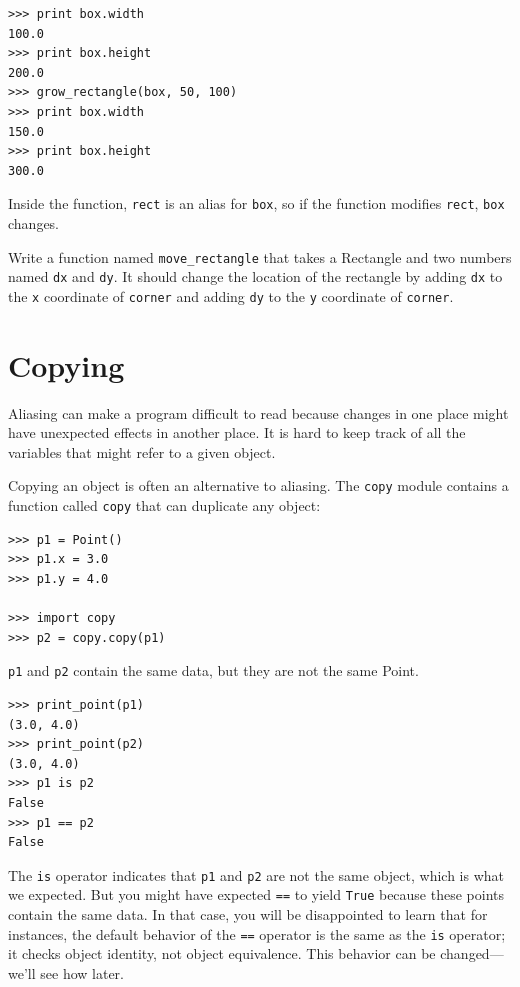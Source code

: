 \documentclass[10pt]{book}
\begin{document}
\begin{CJK}{UTF8}{gbsn}
\begin{verbatim}
>>> print box.width
100.0
>>> print box.height
200.0
>>> grow_rectangle(box, 50, 100)
>>> print box.width
150.0
>>> print box.height
300.0
\end{verbatim}
%
Inside the function, {\tt rect} is an
alias for {\tt box}, so if the function modifies {\tt rect}, 
{\tt box} changes.

\begin{exercise}

Write a function named \verb"move_rectangle" that takes
a Rectangle and two numbers named {\tt dx} and {\tt dy}.  It
should change the location of the rectangle by adding {\tt dx}
to the {\tt x} coordinate of {\tt corner} and adding {\tt dy}
to the {\tt y} coordinate of {\tt corner}.

\end{exercise}


\section{Copying}
\label{copying}

Aliasing can make a program difficult to read because changes
in one place might have unexpected effects in another place.
It is hard to keep track of all the variables that might refer
to a given object.

Copying an object is often an alternative to aliasing.
The {\tt copy} module contains a function called {\tt copy} that
can duplicate any object:

\begin{verbatim}
>>> p1 = Point()
>>> p1.x = 3.0
>>> p1.y = 4.0

>>> import copy
>>> p2 = copy.copy(p1)
\end{verbatim}
%
{\tt p1} and {\tt p2} contain the same data, but they are
not the same Point.

\begin{verbatim}
>>> print_point(p1)
(3.0, 4.0)
>>> print_point(p2)
(3.0, 4.0)
>>> p1 is p2
False
>>> p1 == p2
False
\end{verbatim}
%
The {\tt is} operator indicates that {\tt p1} and {\tt p2} are not the
same object, which is what we expected.  But you might have expected
{\tt ==} to yield {\tt True} because these points contain the same
data.  In that case, you will be disappointed to learn that for
instances, the default behavior of the {\tt ==} operator is the same
as the {\tt is} operator; it checks object identity, not object
equivalence.  This behavior can be changed---we'll see how later.


\end{CJK}
\end{document}
